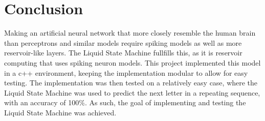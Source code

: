 \section{Conclusion}

Making an artificial neural network that more closely resemble the human brain than perceptrons and similar models require spiking models as well as more reservoir-like layers. The Liquid State Machine fullfills this, as it is reservoir computing that uses spiking neuron models. This project implemented this model in a c++ environment, keeping the implementation modular to allow for easy testing. The implementation was then tested on a relatively easy case, where the Liquid State Machine was used to predict the next letter in a repeating sequence, with an accuracy of 100\%. As such, the goal of implementing and testing the Liquid State Machine was achieved.